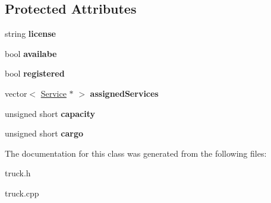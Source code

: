 \subsection*{Protected Attributes}
\begin{DoxyCompactItemize}
\item 
\mbox{\label{class_truck_a3dd293529f462f3a21838f9a6bc5a7d2}} 
string {\bfseries license}
\item 
\mbox{\label{class_truck_aba72f1b27aee018c99f2fd8f06858390}} 
bool {\bfseries availabe}
\item 
\mbox{\label{class_truck_a80b8405cf7a15b236fef70116f99c4fb}} 
bool {\bfseries registered}
\item 
\mbox{\label{class_truck_a3b153477458e5c93c1521ee2f4741638}} 
vector$<$ \hyperlink{class_service}{Service} $\ast$ $>$ {\bfseries assigned\+Services}
\item 
\mbox{\label{class_truck_a14541fad6d47c606ce4e1bd150a68a23}} 
unsigned short {\bfseries capacity}
\item 
\mbox{\label{class_truck_a968fc6b1a6171a03e4254d6615da4ecd}} 
unsigned short {\bfseries cargo}
\end{DoxyCompactItemize}


The documentation for this class was generated from the following files\+:\begin{DoxyCompactItemize}
\item 
truck.\+h\item 
truck.\+cpp\end{DoxyCompactItemize}

